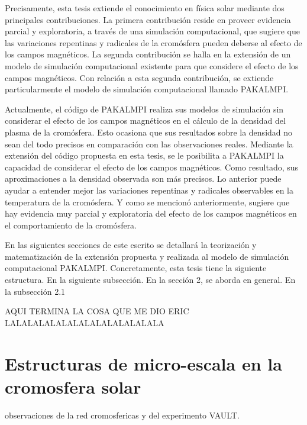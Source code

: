 \documentclass[9pt]{book}
\begin{document}
Precisamente, esta tesis extiende el conocimiento en f\'isica solar mediante dos principales contribuciones. La primera contribuci\'on reside en proveer evidencia parcial y exploratoria, a trav\'es de una simulaci\'on computacional, que sugiere que las variaciones repentinas y radicales de la crom\'osfera pueden deberse al efecto de los campos magn\'eticos. La segunda contribuci\'on se halla en la extensi\'on de un modelo de simulaci\'on computacional existente para que considere el efecto de los campos magn\'eticos. Con relaci\'on a esta segunda contribuci\'on, se extiende particularmente el modelo de simulaci\'on computacional llamado PAKALMPI. 

Actualmente, el c\'odigo de PAKALMPI realiza sus modelos de simulaci\'on sin considerar el efecto de los campos magn\'eticos en el c\'alculo de la densidad del plasma de la crom\'osfera. Esto ocasiona que sus resultados sobre la densidad no sean del todo precisos en comparaci\'on con las observaciones reales. Mediante la extensi\'on del c\'odigo propuesta en esta tesis, se le posibilita a PAKALMPI la capacidad de considerar el efecto de los campos magn\'eticos. Como resultado, sus aproximaciones a la densidad observada son m\'as precisos. Lo anterior puede ayudar a entender mejor las variaciones repentinas y radicales observables en la temperatura de la crom\'osfera. Y como se mencion\'o anteriormente, sugiere que hay evidencia muy parcial y exploratoria del efecto de los campos magn\'eticos en el comportamiento de la crom\'osfera.

En las siguientes secciones de este escrito se detallar\'a la teorizaci\'on y matematizaci\'on de la extensi\'on propuesta y realizada al modelo de simulaci\'on computacional PAKALMPI. Concretamente, esta tesis tiene la siguiente estructura. En la siguiente subsecci\'on. En la secci\'on 2, se aborda  en general. En la subsecci\'on 2.1

AQUI TERMINA LA COSA QUE ME DIO ERIC LALALALALALALALALALALALALALA






\section{Estructuras de micro-escala en la cromosfera solar}
observaciones de la red cromosfericas y del experimento VAULT.
%
\end{document}
